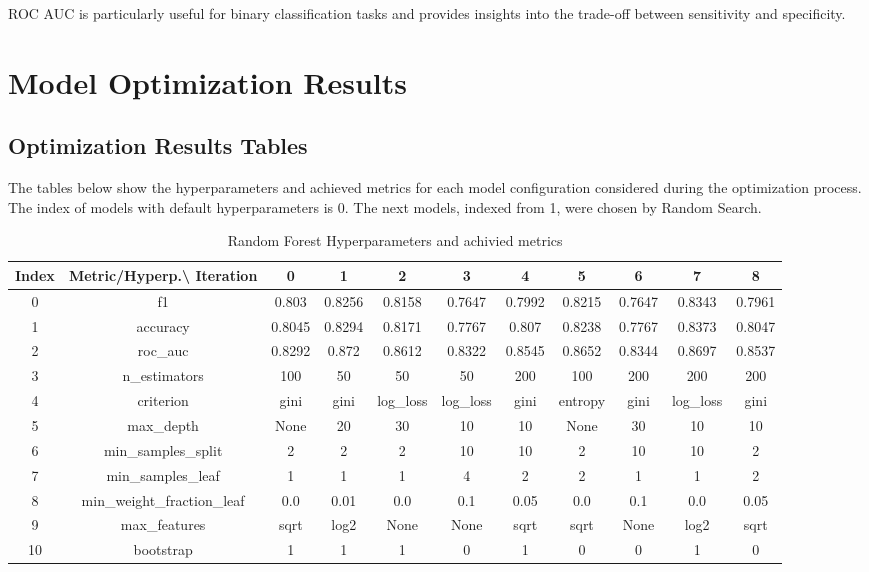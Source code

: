 \documentclass{article}%
\begin{document}
                ROC AUC is particularly useful for binary classification tasks and provides insights into the trade-off between sensitivity and specificity.
                

%
\newpage%
\section{Model Optimization Results}%
\label{sec:ModelOptimizationResults}%
\subsection{Optimization Results Tables}%
\label{subsec:OptimizationResultsTables}%
The tables below show the hyperparameters and achieved metrics for each model configuration considered during the optimization process. The index of models with default hyperparameters is 0. The next models, indexed from 1, were chosen by Random Search.%


\begin{table}[h!]%
\caption{Random Forest Hyperparameters and achivied metrics}%
\vspace{0.2cm}%
\centering%
\begin{tabular}{|c||c||c||c||c||c||c||c||c||c||c|}%
\hline%
Index&Metric/Hyperp.\textbackslash{} Iteration&0&1&2&3&4&5&6&7&8\\%
\hline%
0&f1&0.803&0.8256&0.8158&0.7647&0.7992&0.8215&0.7647&0.8343&0.7961\\%
1&accuracy&0.8045&0.8294&0.8171&0.7767&0.807&0.8238&0.7767&0.8373&0.8047\\%
2&roc\_auc&0.8292&0.872&0.8612&0.8322&0.8545&0.8652&0.8344&0.8697&0.8537\\%
3&n\_estimators&100&50&50&50&200&100&200&200&200\\%
4&criterion&gini&gini&log\_loss&log\_loss&gini&entropy&gini&log\_loss&gini\\%
5&max\_depth&None&20&30&10&10&None&30&10&10\\%
6&min\_samples\_split&2&2&2&10&10&2&10&10&2\\%
7&min\_samples\_leaf&1&1&1&4&2&2&1&1&2\\%
8&min\_weight\_fraction\_leaf&0.0&0.01&0.0&0.1&0.05&0.0&0.1&0.0&0.05\\%
9&max\_features&sqrt&log2&None&None&sqrt&sqrt&None&log2&sqrt\\%
10&bootstrap&1&1&1&0&1&0&0&1&0\\%
\hline%
\end{tabular}%
\end{table}
\end{document}
